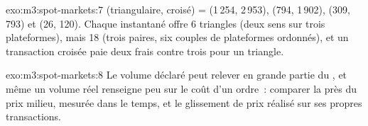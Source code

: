 \begin{solution}{exo:m3:spot-markets:7}
(triangulaire, croisé) = (1\,254, 2\,953), (794, 1\,902), (309, 793) et (26, 120). Chaque instantané offre 6
triangles (deux sens sur trois plateformes), mais 18  (trois paires, six couples de plateformes ordonnés), et un
transaction croisée paie deux frais contre trois pour un triangle.
\end{solution}

\begin{solution}{exo:m3:spot-markets:8}
Le volume déclaré peut relever en grande partie du , et même un volume réel renseigne peu sur le coût d'un ordre~: comparer
la  près du prix milieu, mesurée dans le temps, et le glissement de prix réalisé sur ses propres transactions.
\end{solution}

